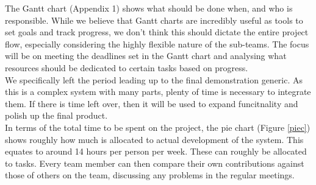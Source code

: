 \documentclass[a4paper,10pt,DIV10,openright,openbib]{scrreprt}
\begin{document}
The Gantt chart (Appendix 1) shows what should be done when, and who is responsible.
While we believe that Gantt charts are incredibly useful as tools to set goals and track
progress, we don't think this should dictate the entire project flow, especially considering
the highly flexible nature of the sub-teams. The focus will be on meeting the deadlines set
in the Gantt chart and analysing what resources should be dedicated to certain
tasks based on progress.\\
We specifically left the period leading up to the final demonstration generic.
As this is a complex system with many parts, plenty of time is necessary to integrate them.
If there is time left over, then it will be used to expand funcitnality and polish up the final product.\\
In terms of the total time to be spent on the project, the pie chart (Figure \ref{piec}) shows roughly how
much is allocated to actual development of the system. This equates to around
14 hours per person per week. These can roughly be allocated to tasks. Every
team member
can then  compare their own contributions against those of others on the team, discussing any
problems in the regular meetings.
\end{document}
